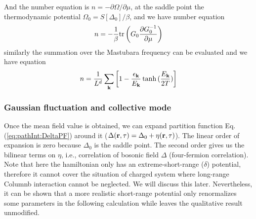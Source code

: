 And the number equation is $n=-\partial\Omega/\partial\mu$, at the saddle point the thermodynamic potential $\Omega_{0}=S[\Delta_{0}]/\beta$, and we have number equation
\begin{equation*}
n=-\frac{1}{\beta}\text{tr}\left({G_{0}\frac{\partial{G_{0}^{-1}}}{\partial{\mu}}}\right)
\end{equation*}
similarly the summation over the Mastubara frequency can be evaluated and we have equation
\begin{equation}
n=\frac{1}{L^{d}}\sum_{\mathbf{k}}\left[1-\frac{\epsilon_{\mathbf{k}}}{E_{\mathbf{k}}}\tanh{(\frac{E_{\ensuremath{\mathbf{k}}}}{2T})}\right]
\end{equation}

\subsubsection{Gaussian fluctuation and collective mode}
Once the mean field value is obtained, we can expand partition function Eq. (\ref{eq:pathInt:DeltaPF}) around it ($\Delta(\mathbf{r},\tau)=\Delta_{0}+\eta(\mathbf{r},\tau)$). The linear order of  expansion is zero because $\Delta_{0}$ is the saddle point.  The second order gives us the bilinear terms on $\eta$, i.e., correlation of bosonic field $\Delta$ (four-fermion correlation).  Note that here the hamiltonian only has an extreme-short-range ($\delta$) potential, therefore it cannot cover the situation of charged system where long-range Columnb interaction cannot be neglected.  We will discuss this later.  Nevertheless, it can be shown that a more realistic short-range potential only renormalizes some parameters in the following calculation while leaves the qualitative result unmodified.  

